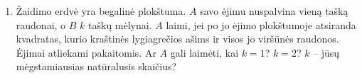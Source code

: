 \begin{enumerate}
  \item \text{[Kvant 1987]} Žaidimo erdvė yra begalinė plokštuma. $A$ savo
    ėjimu nuspalvina vieną tašką raudonai, o $B$ $k$ taškų mėlynai. $A$
    laimi, jei po jo ėjimo plokštumoje atsiranda kvadratas, kurio kraštinės
    lygiagrečios ašims ir visos jo viršūnės raudonos. Ėjimai atliekami
    pakaitomis. Ar $A$ gali laimėti, kai $k=1$? $k=2$? $k$ – jūsų
    mėgstamiausias natūralusis skaičius?

\end{enumerate}
